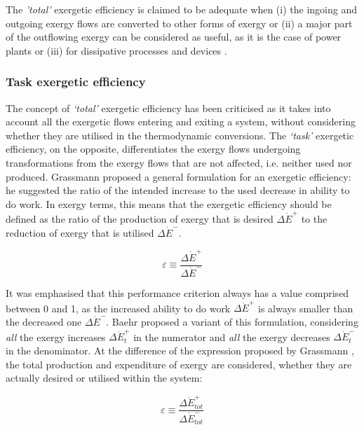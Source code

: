 The \emph{'total'} exergetic efficiency is claimed to be adequate when (i) the ingoing and outgoing exergy flows are converted to other forms of exergy \cite{Cornelissen1997} or (ii) a major part of the outflowing exergy can be considered as useful, as it is the case of power plants \cite{Lior2007} or (iii) for dissipative processes and devices \cite{Moran1989,Kotas1995}. 

 
\subsubsection{Task exergetic efficiency}

The concept of \emph{`total'} exergetic efficiency has been criticised as it takes into account all the exergetic flows entering and exiting a system, without considering whether they are utilised in the thermodynamic conversions. The \emph{`task'} exergetic efficiency, on the opposite, differentiates the exergy flows undergoing transformations from the exergy flows that are not affected, i.e. neither used nor produced. Grassmann \cite{Grassmann1950} proposed a general formulation for an exergetic efficiency: he suggested the ratio of the intended increase to the used decrease in ability to do work. In exergy terms, this means that the exergetic efficiency should be defined as the ratio of the production of exergy that is desired $\Delta \dot{E}^+$ to the reduction of exergy that is utilised $\Delta \dot{E}^-$.

\begin{equation}
	\varepsilon \equiv \frac{\Delta \dot{E}^+}{\Delta \dot{E}^-}
\end{equation}

It was emphasised that this performance criterion always has a value comprised between 0 and 1, as the increased ability to do work $\Delta \dot{E}^+$ is always smaller than the decreased one $\Delta \dot{E}^-$. Baehr \cite{Baehr1968} proposed a variant of this formulation, considering \emph{all} the exergy increases $\Delta \dot{E}^+_t$ in the numerator and \emph{all} the exergy decreases $\Delta \dot{E}^-_t$ in the denominator. At the difference of the expression proposed by Grassmann \cite{Grassmann1950}, the total production and expenditure of exergy are considered, whether they are actually desired or utilised within the system:

\begin{equation}
	\varepsilon \equiv \frac{\Delta \dot{E}^+_{tot}}{\Delta \dot{E}^-_{tot}}
\end{equation}

